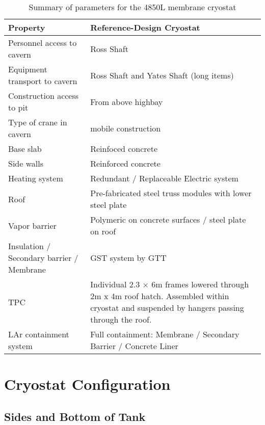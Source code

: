 
\begin{table}
\caption{Summary of parameters for the 4850L membrane cryostat} 
\label{table:cryo-reqs}
\begin{tabular}[htbp]{| p{}|p{}|}
\hline 
\textbf{Property} & \textbf{Reference-Design Cryostat}\\
\hline
Personnel access to cavern & Ross Shaft\\
\hline
Equipment transport to cavern & Ross Shaft and Yates Shaft (long items)\\
\hline
Construction access to pit & From above highbay \\
\hline
Type of crane in cavern & mobile construction \\
\hline
Base slab & Reinfoced concrete \\
\hline
Side walls & Reinforced concrete \\
\hline
Heating system & Redundant / Replaceable Electric system \\
\hline
Roof & Pre-fabricated steel truss modules with lower steel plate \\
\hline
Vapor barrier & Polymeric on concrete surfaces / steel plate on roof  \\
\hline
Insulation / Secondary barrier / Membrane & GST system by GTT \\
\hline
TPC & Individual 2.3 $\times$ 6m frames lowered through 2m x 4m roof hatch. Assembled within cryostat and suspended by hangers passing through the roof. \\
\hline
LAr containment system & Full containment: Membrane / Secondary Barrier / Concrete Liner  \\
\hline
\end{tabular} 
\end{table}



\section{Cryostat Configuration}

\subsection{Sides and Bottom of Tank}

